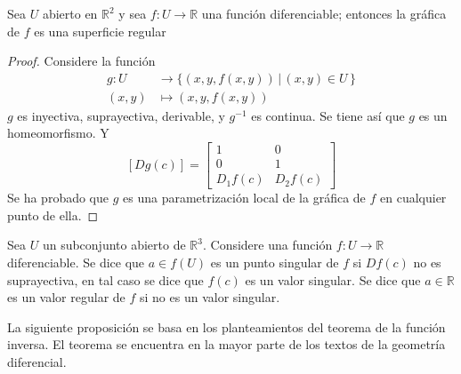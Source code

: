 \begin{proposition}
  Sea $U$ abierto en $\mathbb{R}^2$ y sea $f: U \to \mathbb{R}$ una función
  diferenciable; entonces la gráfica de $f$ es una superficie regular

\end{proposition}
\begin{proof}
 Considere la función
 \begin{align*}
   g: U &\to \{ (x, y, f(x,y)) \, | \, (x,y) \in U \, \} \\
   (x,y) &\mapsto (x, y , f(x,y))
 \end{align*}
 $g$ es inyectiva, suprayectiva, derivable, y $g^{-1}$ es continua. Se tiene así
 que $g$ es un homeomorfismo. Y
 \[
   [Dg(c)] =%
   \begin{bmatrix}
     1 & 0 \\
     0 & 1 \\
     D_1f(c) & D_2f(c)
   \end{bmatrix}
 \]
Se ha probado que $g$ es una parametrización local de la gráfica de $f$ en
cualquier punto de ella.

\end{proof}
\begin{definition}
Sea $U$ un subconjunto abierto de $\mathbb{R}^3$. Considere una función $f: U
\to \mathbb{R}$ diferenciable. Se dice que $a \in f(U)$ es un punto singular de
$f$ si $Df(c)$ no es suprayectiva, en tal caso se dice que $f(c)$ es un valor
singular. Se dice que $a \in \mathbb{R}$ es un valor regular de $f$ si no es un
valor singular. 

\end{definition}
La siguiente proposición se basa en los planteamientos del teorema de la función
inversa. El teorema se encuentra en la mayor parte de los textos de la geometría
diferencial.

